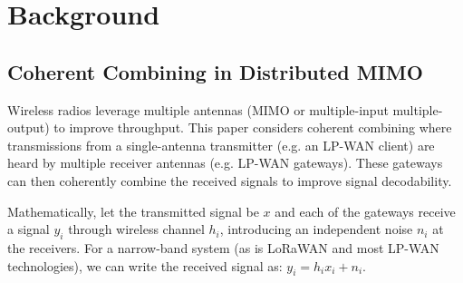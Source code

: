 \section{Background}
\label{sec:background}

\subsection{Coherent Combining in Distributed MIMO}
\label{sec:simo}

Wireless radios leverage multiple antennas (MIMO or multiple-input
multiple-output) to improve throughput. This paper considers coherent
combining where transmissions from a single-antenna transmitter (e.g. an
LP-WAN client) are heard by multiple receiver antennas (e.g. LP-WAN gateways).
These gateways can then coherently combine the received signals to improve
signal decodability.




Mathematically, let the transmitted signal be $x$ and each of the gateways
receive a signal $y_i$ through wireless channel $h_i$, introducing an
independent noise $n_i$ at the receivers. For a narrow-band system (as is
LoRaWAN and most LP-WAN technologies), we can write the received signal as:
$y_i = h_i x_i + n_i $.


